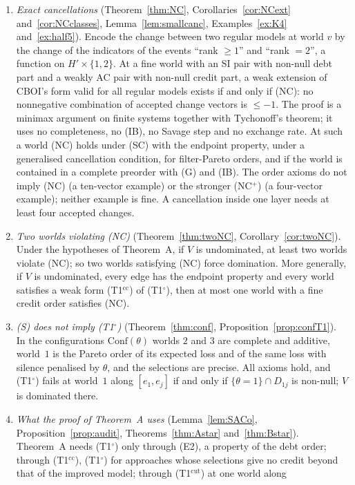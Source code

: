 \documentclass[11pt]{article}
\theoremstyle{definition}\newtheorem{definition}[theorem]{Definition}
\theoremstyle{remark}\newtheorem{remark}[theorem]{Remark}
\newcommand{\To}{\textup{(T1$^\circ$)}}
\newcommand{\Tcc}{\textup{(T1$^{\mathrm{cc}}$)}}
\newcommand{\Tcut}{\textup{(T1$^{\mathrm{cut}}$)}}
\begin{document}
\begin{enumerate}[leftmargin=*,itemsep=3pt]
world has the endpoint property on both of its edges.
\item \emph{Exact cancellations} (Theorem~\ref{thm:NC},
Corollaries~\ref{cor:NCext} and~\ref{cor:NCclasses},
Lemma~\ref{lem:smallcanc}, Examples~\ref{ex:K4} and~\ref{ex:half5}). Encode the change between
two regular models at world $v$ by the change of the indicators of the
events ``rank $\ge1$'' and ``rank $=2$'', a function on $H'\times\{1,2\}$. At a fine world with an SI
pair with non-null debt part and a weakly AC pair with non-null credit part,
a weak extension of CBOI's form valid for all regular models exists if and
only if (NC): no nonnegative combination of accepted change vectors is
$\le-1$. The proof is a minimax argument on finite systems together with
Tychonoff's theorem; it uses no completeness, no (IB), no Savage step and no
exchange rate. At such a world (NC) holds under (SC) with the endpoint
property, under a generalised cancellation condition, for filter-Pareto
orders, and if the world is contained in a complete preorder with (G) and
(IB). The order axioms do not imply (NC) (a ten-vector example) or the
stronger (NC$^+$) (a four-vector example); neither example is fine. A
cancellation inside one layer needs at least four accepted changes.
\item \emph{Two worlds violating (NC)} (Theorem~\ref{thm:twoNC},
Corollary~\ref{cor:twoNC}). Under the hypotheses of Theorem~A, if $V$ is
undominated, at least two worlds violate (NC); so two worlds satisfying (NC)
force domination. More generally, if $V$ is undominated, every edge has the
endpoint property and every world satisfies a weak form \Tcc{} of \To, then
at most one world with a fine credit order satisfies (NC).
\item \emph{(S) does not imply \To} (Theorem~\ref{thm:conf},
Proposition~\ref{prop:confT1}). In the configurations
$\mathrm{Conf}(\theta)$ worlds $2$ and $3$ are complete and additive,
world~$1$ is the Pareto order of its expected loss and of the same loss with
silence penalised by $\theta$, and the selections are precise. All axioms
hold, and \To{} fails at world~$1$ along $[e_1,e_j]$ if and only if
$\{\theta=1\}\cap D_{1j}$ is non-null; $V$ is dominated there.
\item \emph{What the proof of Theorem~A uses} (Lemma~\ref{lem:SACo},
Proposition~\ref{prop:audit}, Theorems~\ref{thm:Astar}
and~\ref{thm:Bstar}). Theorem~A needs \To{} only through (E2), a property of
the debt order; through \Tcc, \To{} for approaches whose selections give no
credit beyond that of the improved model; through \Tcut{} at one world along

\end{enumerate}
\end{document}
